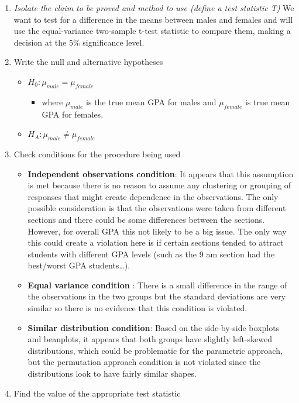\documentclass[]{book}
\providecommand{\tightlist}{%
  \setlength{\itemsep}{0pt}\setlength{\parskip}{0pt}}
\theoremstyle{definition}
\theoremstyle{definition}
\theoremstyle{remark}
\begin{document}
\begin{enumerate}
\def\labelenumi{\arabic{enumi}.}
\setcounter{enumi}{-1}
\item
  \emph{Isolate the claim to be proved and method to use (define a test
  statistic T)} We want to test for a difference in the means between
  males and females and will use the equal-variance two-sample t-test
  statistic to compare them, making a decision at the 5\% significance
  level.
\item
  Write the null and alternative hypotheses

  \begin{itemize}
  \item
    \(H_0: \mu_{male} = \mu_{female}\)

    \begin{itemize}
    \tightlist
    \item
      where \(\mu_{male}\) is the true mean GPA for males and
      \(\mu_{female}\) is true mean GPA for females.
    \end{itemize}
  \item
    \(H_A: \mu_{male} \ne \mu_{female}\)
  \end{itemize}
\item
  Check conditions for the procedure being used

  \begin{itemize}
  \item
    \textbf{Independent observations condition}: It appears that this
    assumption is met because there is no reason to assume any
    clustering or grouping of responses that might create dependence in
    the observations. The only possible consideration is that the
    observations were taken from different sections and there could be
    some differences between the sections. However, for overall GPA this
    not likely to be a big issue. The only way this could create a
    violation here is if certain sections tended to attract students
    with different GPA levels (such as the 9 am section had the
    best/worst GPA students\ldots{}).
  \item
    \textbf{Equal variance condition} : There is a small difference in
    the range of the observations in the two groups but the standard
    deviations are very similar so there is no evidence that this
    condition is violated.
  \item
    \textbf{Similar distribution condition}: Based on the side-by-side
    boxplots and beanplots, it appears that both groups have slightly
    left-skewed distributions, which could be problematic for the
    parametric approach, but the permutation approach condition is not
    violated since the distributions look to have fairly similar shapes.
  \end{itemize}
\item
  Find the value of the appropriate test statistic


\end{enumerate}
\end{document}
